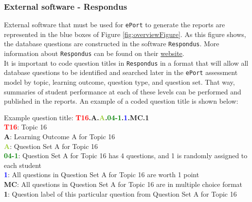 \documentclass{article}\usepackage[]{graphicx}\usepackage[]{color}
\numberwithin{equation}{section} %
\begin{document}
\subsubsection{External software - Respondus}
\label{sec:ResSection}

External software that must be used for \texttt{ePort} to generate the reports are represented in the blue boxes of Figure \ref{fig:overviewFigure}. As this figure shows, the database questions are constructed in the software \texttt{Respondus}. More information about \texttt{Respondus} can be found on their \href{https://www.respondus.com/}{website}.\\

It is important to code question titles in \texttt{Respondus} in a format that will allow all database questions to be identified and searched later in the \texttt{ePort} assessment model by topic, learning outcome, question type, and question set. That way, summaries of student performance at each of these levels can be performed and published in the reports. An example of a coded question title is shown below:\\

\begin{framed}
Example question title: \textbf{\textcolor{Red}{T16}.\textcolor{YellowOrange}{A}.\textcolor{YellowGreen}{A}.\textcolor{Green}{04-1}.\textcolor{blue}{1}.\textcolor{RedViolet}{MC}.\textcolor{VioletRed}{1}}\\

\textbf{\textcolor{Red}{T16}}: Topic 16\\
\textbf{\textcolor{YellowOrange}{A}}: Learning Outcome A for Topic 16\\
\textbf{\textcolor{YellowGreen}{A}}: Question Set A for Topic 16\\
\textbf{\textcolor{Green}{04-1}}: Question Set A for Topic 16 has 4 questions, and 1 is randomly assigned to each student\\
\textbf{\textcolor{blue}{1}}: All questions in Question Set A for Topic 16 are worth 1 point\\
\textbf{\textcolor{RedViolet}{MC}}: All questions in Question Set A for Topic 16 are in multiple choice format\\
\textbf{\textcolor{VioletRed}{1}}: Question label of this particular question from Question Set A for Topic 16\\
\vspace{-3mm}
\end{framed}
\end{document}
